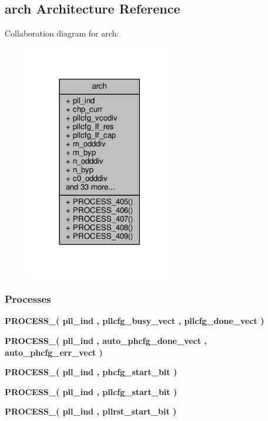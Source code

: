 \subsection{arch Architecture Reference}
\label{classpllcfg__top_1_1arch}


Collaboration diagram for arch\+:\nopagebreak
\begin{figure}[H]
\begin{center}
\leavevmode
\includegraphics[width=182pt]{df/d17/classpllcfg__top_1_1arch__coll__graph}
\end{center}
\end{figure}
\subsubsection*{Processes}
 \begin{DoxyCompactItemize}
\item 
{\bf P\+R\+O\+C\+E\+S\+S\+\_}{\bfseries  ( {\bfseries {\bfseries {\bf pll\+\_\+ind}} \textcolor{vhdlchar}{ }} , {\bfseries {\bfseries {\bf pllcfg\+\_\+busy\+\_\+vect}} \textcolor{vhdlchar}{ }} , {\bfseries {\bfseries {\bf pllcfg\+\_\+done\+\_\+vect}} \textcolor{vhdlchar}{ }} )}
\item 
{\bf P\+R\+O\+C\+E\+S\+S\+\_}{\bfseries  ( {\bfseries {\bfseries {\bf pll\+\_\+ind}} \textcolor{vhdlchar}{ }} , {\bfseries {\bfseries {\bf auto\+\_\+phcfg\+\_\+done\+\_\+vect}} \textcolor{vhdlchar}{ }} , {\bfseries {\bfseries {\bf auto\+\_\+phcfg\+\_\+err\+\_\+vect}} \textcolor{vhdlchar}{ }} )}
\item 
{\bf P\+R\+O\+C\+E\+S\+S\+\_}{\bfseries  ( {\bfseries {\bfseries {\bf pll\+\_\+ind}} \textcolor{vhdlchar}{ }} , {\bfseries {\bfseries {\bf phcfg\+\_\+start\+\_\+bit}} \textcolor{vhdlchar}{ }} )}
\item 
{\bf P\+R\+O\+C\+E\+S\+S\+\_}{\bfseries  ( {\bfseries {\bfseries {\bf pll\+\_\+ind}} \textcolor{vhdlchar}{ }} , {\bfseries {\bfseries {\bf pllcfg\+\_\+start\+\_\+bit}} \textcolor{vhdlchar}{ }} )}
\item 
{\bf P\+R\+O\+C\+E\+S\+S\+\_}{\bfseries  ( {\bfseries {\bfseries {\bf pll\+\_\+ind}} \textcolor{vhdlchar}{ }} , {\bfseries {\bfseries {\bf pllrst\+\_\+start\+\_\+bit}} \textcolor{vhdlchar}{ }} )}
\end{DoxyCompactItemize}

